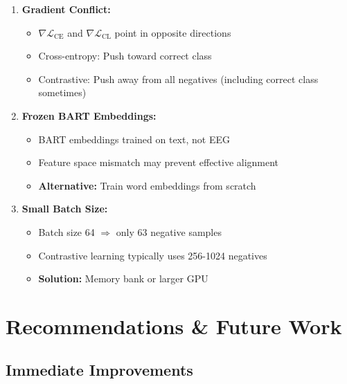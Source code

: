 \documentclass[12pt,a4paper]{article}
\begin{document}
\begin{enumerate}
    \item \textbf{Gradient Conflict:}
    \begin{itemize}
        \item $\nabla \mathcal{L}_{\text{CE}}$ and $\nabla \mathcal{L}_{\text{CL}}$ point in opposite directions
        \item Cross-entropy: Push toward correct class
        \item Contrastive: Push away from all negatives (including correct class sometimes)
    \end{itemize}
    
    \item \textbf{Frozen BART Embeddings:}
    \begin{itemize}
        \item BART embeddings trained on text, not EEG
        \item Feature space mismatch may prevent effective alignment
        \item \textbf{Alternative:} Train word embeddings from scratch
    \end{itemize}
    
    \item \textbf{Small Batch Size:}
    \begin{itemize}
        \item Batch size 64 $\Rightarrow$ only 63 negative samples
        \item Contrastive learning typically uses 256-1024 negatives
        \item \textbf{Solution:} Memory bank or larger GPU
    \end{itemize}
\end{enumerate}

\section{Recommendations \& Future Work}

\subsection{Immediate Improvements}
\end{document}
